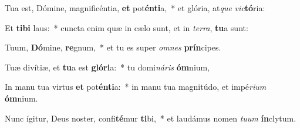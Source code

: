 \item Tua est, Dómine, magnificéntia, \textbf{et} pot\textbf{én}\textbf{ti}a,~* et glória, at\textit{que} \textit{vic}\textbf{tó}ria:
\item Et \textbf{ti}\textbf{bi} laus:~* cuncta enim quæ in cælo sunt, et in \textit{ter}\textit{ra}, \textbf{tu}a sunt:
\item Tuum, \textbf{Dó}mine, \textbf{re}gnum,~* et tu es super \textit{om}\textit{nes} \textbf{prín}cipes.
\item Tuæ divítiæ, et \textbf{tu}a est \textbf{gló}\textbf{ri}a:~* tu domi\textit{ná}\textit{ris} \textbf{óm}nium,
\item In manu tua virtus \textbf{et} pot\textbf{én}\textbf{ti}a:~* in manu tua magnitúdo, et impé\textit{ri}\textit{um} \textbf{óm}nium.
\item Nunc ígitur, Deus noster, confi\textbf{té}mur \textbf{ti}bi,~* et laudámus nomen \textit{tu}\textit{um} \textbf{ín}clytum.
